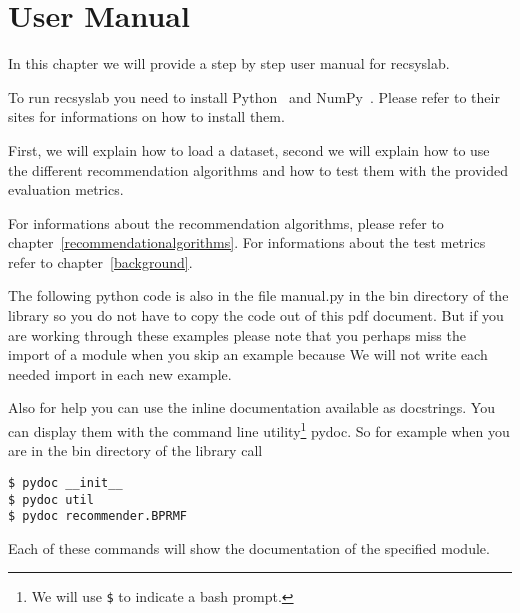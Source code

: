 \chapter{User Manual}
\label{usermanual}
In this chapter we will provide a step by step user manual for recsyslab.

To run recsyslab you need to install Python~\cite{python} and NumPy~\cite{numpy}.
Please refer to their sites for informations on how to install them.

First, we will explain how to load a dataset, second we
will explain how to use the different recommendation algorithms and
how to test them with the provided evaluation metrics. 

For informations about the recommendation algorithms, please refer to chapter~\ref{recommendationalgorithms}.
For informations about the test metrics refer to chapter~\ref{background}.

The following python code is also in the file manual.py in the bin directory of the library
so you do not have to copy the code out of this pdf document. But if you are working through these examples
please note that you perhaps miss the import of a module when you skip an example because
We will not write each needed import in each new example.

Also for help you can use the inline documentation available as docstrings.
You can display them with the command line utility\footnote{We will use \lstinline!$! to indicate a bash prompt.} pydoc.
So for example when you are in the bin directory of the library call

\begin{lstlisting}
$ pydoc __init__
$ pydoc util 
$ pydoc recommender.BPRMF
\end{lstlisting}
Each of these commands will show the documentation of the specified module.


